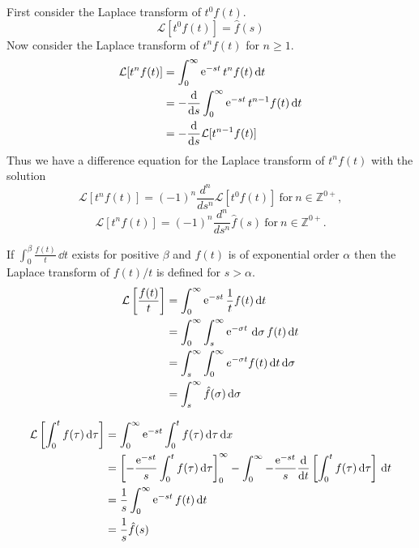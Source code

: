 {%
\begin{Solution}
  \label{solution L(t n f) = }
  First consider the Laplace transform of $t^0 f(t)$.
  \[
  \mathcal{L}[t^0 f(t)] = \hat{f}(s)
  \]
  Now consider the Laplace transform of $t^n f(t)$ for $n \geq 1$.
  \begin{align*}
    \mathcal{L}[t^n f(t)]
    &= \int_0^\infty \mathop{\mathrm{e}}\nolimits^{-s t} t^n f(t)\,\mathrm{d} t \\
    &= -\frac{\mathrm{d}}{\mathrm{d} s} \int_0^\infty \mathop{\mathrm{e}}\nolimits^{-s t} t^{n-1} f(t)\,\mathrm{d} t \\
    &= -\frac{\mathrm{d}}{\mathrm{d} s} \mathcal{L}[t^{n-1} f(t)]
  \end{align*}
  Thus we have a difference equation for the Laplace transform of $t^n f(t)$ 
  with the solution
  \[
  \mathcal{L}[t^n f(t)] = (-1)^n \frac{d^n}{d s^n} \mathcal{L}[t^0 f(t)]\ 
  \mathrm{for}\ n \in \mathbb{Z}^{0+},
  \]
  \[
  \boxed{
    \mathcal{L}[t^n f(t)] = (-1)^n \frac{d^n}{d s^n} \hat{f}(s)\ 
    \mathrm{for}\ n \in \mathbb{Z}^{0+}.
    }
  \]
\end{Solution}





\begin{Solution}
  \label{solution L(f(t)/t)}
  If $\int_0^\beta \frac{f(t)}{t}\,\dd t$ exists for positive $\beta$ and 
  $f(t)$ is of exponential order $\alpha$ then the Laplace transform
  of $f(t)/t$ is defined for $s > \alpha$.
  \begin{align*}
    \mathcal{L}\left[\frac{f(t)}{t}\right]
    &= \int_0^\infty \mathop{\mathrm{e}}\nolimits^{-s t} \frac{1}{t} f(t)\,\mathrm{d} t \\
    &= \int_0^\infty \int_s^\infty \mathop{\mathrm{e}}\nolimits^{-\sigma t}\,\mathrm{d} \sigma  \, f(t)\,\mathrm{d} t \\
    &= \int_s^\infty \int_0^\infty e^{-\sigma t}f(t)\,\mathrm{d} t\,\mathrm{d} \sigma \\
    &= \int_s^\infty \hat{f}(\sigma)\,\mathrm{d} \sigma
  \end{align*}
\end{Solution}




\begin{Solution}
  \label{solution L(int f(t))}
  \begin{align*}
    \mathcal{L}\left[ \int_0^t f(\tau)\,\mathrm{d} \tau \right]
    &= \int_0^\infty \mathop{\mathrm{e}}\nolimits^{-s t} \int_0^t f(\tau)\,\mathrm{d} \tau\,\mathrm{d} x 
    \\
    &= \left[ -\frac{\mathop{\mathrm{e}}\nolimits^{-s t}}{s} \int_0^t f(\tau)\,\mathrm{d} \tau \right]_0^\infty
    - \int_0^\infty -\frac{\mathop{\mathrm{e}}\nolimits^{-s t}}{s} 
    \frac{\mathrm{d}}{\mathrm{d} t} \left[ \int_0^t f(\tau)\,\mathrm{d} \tau \right]\,\mathrm{d} t 
    \\
    &= \frac{1}{s} \int_0^\infty \mathop{\mathrm{e}}\nolimits^{-s t} f(t)\,\mathrm{d} t 
    \\
    &= \frac{1}{s} \hat{f}(s) 
  \end{align*}
\end{Solution}










}
